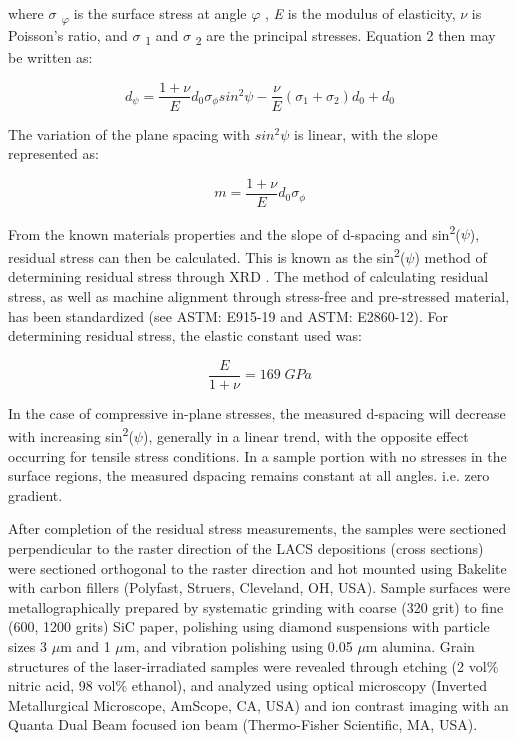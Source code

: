 		where \textit{$ \sigma $ \textsubscript{$ \varphi $  }}is the surface stress at angle \textit{$ \varphi $ }, \textit{E} is the modulus of elasticity, \textit{$ \nu $ } is Poisson’s ratio, and \textit{$ \sigma $ }\textsubscript{1} and \textit{$ \sigma $ }\textsubscript{2} are the principal stresses. Equation 2 then may be written as:
		
		
		
		\begin{equation}
		d_{ \psi }=\frac{1+ \nu }{E}d_{0}  \sigma _{ \phi }sin^{2} \psi  -\frac{ \nu }{E} (  \sigma _{1}+ \sigma _{2} ) d_{0}+d_{0}	
		\end{equation}
		
		
		
		The variation of the plane spacing with  \( sin^{2} \psi  \)  is linear, with the slope represented as:
		
		
		
		\begin{equation}
		m=\frac{1+ \nu }{E}d_{0} \sigma _{ \phi }
		\end{equation}
		
		
		
		From the known materials properties and the slope of d-spacing and sin\textsuperscript{2}($\psi$), residual stress can then be calculated. This is known as the sin\textsuperscript{2}($\psi$) method of determining residual stress through XRD \cite{RN1385}. The method of calculating residual stress, as well as machine alignment through stress-free and pre-stressed material, has been standardized (see ASTM: E915-19 and ASTM: E2860-12). For determining residual stress, the elastic constant used was: 
		
		
		\begin{equation}
		\frac{E}{1+ \nu }=169 \; GPa
		\end{equation}
		
		In the case of compressive in-plane stresses, the measured d-spacing will decrease with increasing sin\textsuperscript{2}($\psi$), generally in a linear trend, with the opposite effect occurring for tensile stress conditions. In a sample portion with no stresses in the surface regions, the measured dspacing remains constant at all  angles. i.e. zero gradient.
		
		
		
		
		After completion of the residual stress measurements, the samples were sectioned perpendicular to the raster direction of the LACS depositions (cross sections) were sectioned orthogonal to the raster direction and hot mounted using Bakelite with carbon fillers (Polyfast, Struers, Cleveland, OH, USA). Sample surfaces were metallographically prepared by systematic grinding with coarse (320 grit) to fine (600, 1200 grits) SiC paper,  polishing using diamond suspensions with particle sizes 3 $ \mu$m and 1 $ \mu$m, and vibration polishing using 0.05 $ \mu$m alumina. Grain structures of the laser-irradiated samples were revealed through etching (2 vol$\%$  nitric acid, 98 vol$\%$  ethanol), and analyzed using optical microscopy (Inverted Metallurgical Microscope, AmScope, CA, USA) and ion contrast imaging with an Quanta Dual Beam focused ion beam (Thermo-Fisher Scientific, MA, USA).
		
